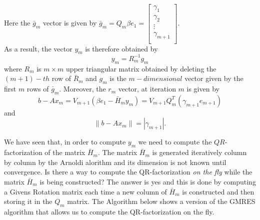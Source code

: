 \noindent Here the $\bar{g}_m$ vector is given by $\bar{g}_m = Q_m\beta e_1 = \begin{bmatrix}
\gamma_1 \\
\gamma_2 \\
\vdots \\
\gamma_{m+1} \\
\end{bmatrix} $.\\

\noindent As a result, the vector $y_m$ is therefore obtained by \begin{equation}
    y_m = R_m^{-1} g_m
\end{equation}
where $R_m$ is $m \times m$ upper triangular matrix obtained by deleting the $(m+1)-th$ row of $\bar{R}_m$ and $g_m$ is the $m-dimensional$ vector given by the first $m$ rows of $\bar{g}_m$. Moreover, the $r_m$ vector, at iteration $m$ is given by $$b - Ax_m = V_{m+1}(\beta e_1 - \bar{H}_my_m)= V_{m+1}Q_m^T(\gamma_{m+1} e_{m+1} ) 
$$ and 
\begin{equation} \label{eq_gmres_residual}
    \|b - Ax_m \| = |\gamma_{m+1}|.  
\end{equation}

We have seen that, in order to compute \(y_m\) we need to compute the \(QR\)-factorization of the matrix \(\bar{H}_m\). The matrix \(\bar{H}_m\) is generated iteratively column by column by the Arnoldi alorithm and its dimension is not known until convergence. Is there a way to compute the QR-factorization \textit{on the fly} while the matrix \(\bar{H}_m\) is being constructed? The answer is yes and this is done by computing a Givens Rotation matrix each time a new column of \(\bar{H}_m\) is constructed and then storing it in the \(Q_m\) matrix. The Algorithm below shows a version of the GMRES algorithm that allows us to compute the QR-factorization on the fly. 

